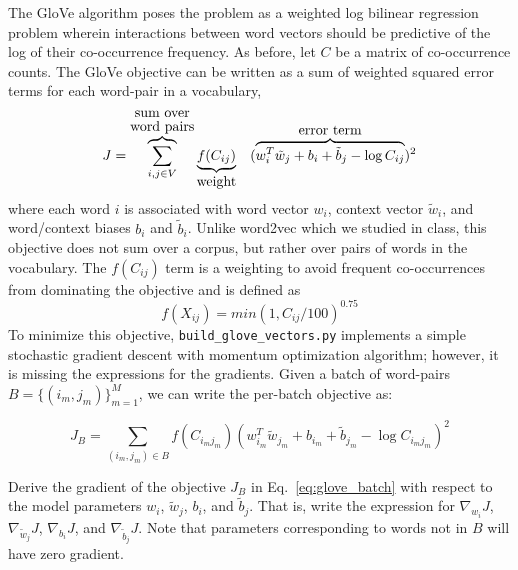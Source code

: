 \documentclass[a4paper,10pt]{article}
\begin{document}
The GloVe algorithm poses the problem as a weighted log bilinear regression problem wherein interactions between word vectors should be predictive of the log of their co-occurrence frequency. As before, let $C$ be a matrix of co-occurrence counts. The GloVe objective can be written as a sum of weighted squared error terms for each word-pair in a vocabulary,
%
\begin{equation}
    J = \overbrace{\sum_{i,j  \in V}}^{\mbox{\shortstack{sum over\\ word pairs}}} \underbrace{f(C_{ij})}_{\mbox{weight}} ~~~( \overbrace{w_i^T\tilde{w}_j + b_i + \tilde{b}_j - \log C_{ij}}^{\mbox{error term}})^2
    \label{eq:glove}
\end{equation}
%
where each word $i$ is associated with word vector $w_i$, context vector $\tilde{w}_i$, and word/context biases $b_i$ and $\tilde{b}_i$.  Unlike word2vec which we studied in class, this objective does not sum over a corpus, but rather over pairs of words in the vocabulary. The $f(C_{ij})$ term is a weighting to avoid frequent co-occurrences from dominating the objective and is defined as
\begin{equation}
    f(X_{ij}) = min(1, C_{ij}/100)^{0.75}
\end{equation}
%
To minimize this objective, \texttt{build\_glove\_vectors.py} implements a simple stochastic gradient descent with momentum optimization algorithm; however, it is missing the expressions for the gradients.
Given a batch of word-pairs $B = \{ (i_m,j_m)\}_{m=1}^M$, we can write the per-batch objective as:

\begin{equation}
    J_B = \sum_{ (i_m,j_m)  \in B} f(C_{i_m j_m})( w_{i_m}^T\tilde{w}_{j_m} + b_{i_m} + \tilde{b}_{j_m} - \log C_{i_m j_m})^2
    \label{eq:glove_batch}
\end{equation}


\vspace{5pt}
\begin{taskbox}
 Derive the gradient of the objective $J_B$ in Eq.~\ref{eq:glove_batch} with respect to the model parameters $w_i$, $\tilde{w}_j$, $b_i$, and $\tilde{b}_j$. That is, write the expression for $\nabla_{w_i}J$, $\nabla_{\tilde{w}_j}J$, $\nabla_{b_i}J$, and $\nabla_{\tilde{b}_j}J$. Note that parameters corresponding to words not in $B$ will have zero gradient. 
\end{taskbox} 
\vspace{5pt}
\end{document}
